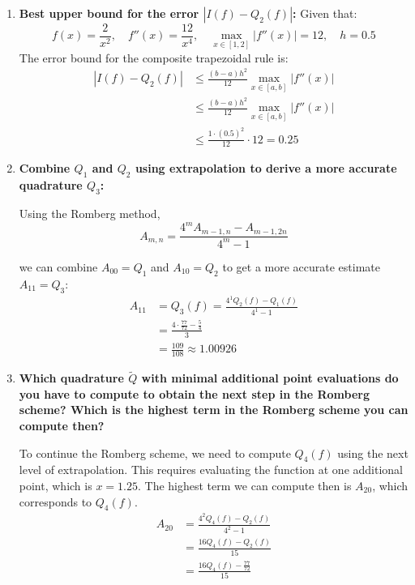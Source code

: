 \begin{enumerate}[label=(\alph*)]
    \item \textbf{Best upper bound for the error \( |I(f) - Q_2(f)| \):}
          Given that:
          \[
              f(x) = \frac{2}{x^2}, \quad f''(x) = \frac{12}{x^4}, \quad \max_{x \in [1,2]} |f''(x)| = 12, \quad h = 0.5
          \]
          The error bound for the composite trapezoidal rule is:
          \begin{align*}
              |I(f) - Q_2(f)| & \leq \frac{(b-a) h^2}{12} \max_{x \in [a,b]} |f''(x)| \\
                              & \leq \frac{(b-a) h^2}{12} \max_{x \in [a,b]} |f''(x)| \\
                              & \leq \frac{1 \cdot (0.5)^2}{12} \cdot 12 = 0.25
          \end{align*}

    \item \textbf{Combine \( Q_1 \) and \( Q_2 \) using extrapolation to derive a more accurate quadrature \( Q_3 \):}

          Using the Romberg method,
          \[
              A_{m,n} = \frac{4^m A_{m-1,n} - A_{m-1,2n}}{4^m - 1}
          \]

          we can combine \( A_{00} = Q_1 \) and \( A_{10} = Q_2 \) to get a more accurate estimate \(A_{11}= Q_3 \):
          \begin{align*}
              A_{11} & = Q_3(f) = \frac{4^1 Q_2(f) - Q_1(f)}{4^1 - 1}  \\
                     & = \frac{4 \cdot \frac{77}{72} - \frac{5}{4}}{3} \\
                     & = \frac{109}{108} \approx 1.00926
          \end{align*}

    \item \textbf{Which quadrature \( \tilde{Q} \) with minimal additional point evaluations do you have to compute to obtain the next step in the Romberg scheme? Which is the highest term in the Romberg scheme you can compute then?}

          To continue the Romberg scheme, we need to compute \( Q_4(f) \) using the next level of extrapolation. This requires evaluating the function at one additional point, which is \( x = 1.25 \).
          The highest term we can compute then is \( A_{20} \), which corresponds to \( Q_4(f) \).
          \begin{align*}
              A_{20} & = \frac{4^2 Q_4(f) - Q_2(f)}{4^2 - 1} \\
                     & = \frac{16 Q_4(f) - Q_2(f)}{15} \\
                     & = \frac{16 Q_4(f) - \frac{77}{72}}{15}
          \end{align*}


\end{enumerate}
